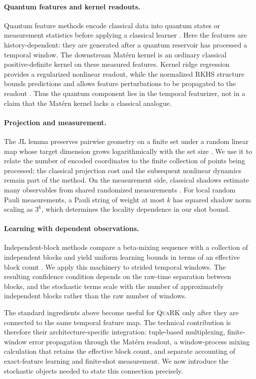 \paragraph{Quantum features and kernel readouts.}
Quantum feature methods encode classical data into quantum states or
measurement statistics before applying a classical learner
\citep{SchuldKilloran2019,HuangBroughtonEtAl2021}. Here the features are
history-dependent: they are generated after a quantum reservoir has processed
a temporal window. The downstream Mat\'ern kernel is an ordinary classical
positive-definite kernel on these measured features. Kernel ridge regression
provides a regularized nonlinear readout, while the normalized RKHS structure
bounds predictions and allows feature perturbations to be propagated to the
readout \citep{Genton2001,PorcuEtAl2024,HofmannScholkopfSmola2008}. Thus the
quantum component lies in the temporal featurizer, not in a claim that the
Mat\'ern kernel lacks a classical analogue.

\paragraph{Projection and measurement.}
The JL lemma preserves pairwise geometry on a finite set under a random linear
map whose target dimension grows logarithmically with the set size
\citep{DasguptaGupta2003,Woodruff2014}. We use it to relate the number of
encoded coordinates to the finite collection of points being processed; the
classical projection cost and the subsequent nonlinear dynamics remain part of
the method. On the measurement side, classical shadows estimate many
observables from shared randomized measurements \citep{HuangKuengPreskill2020}.
For local random Pauli measurements, a Pauli string of weight at most \(k\) has
squared shadow norm scaling as \(3^k\), which determines the locality dependence
in our shot bound.

\paragraph{Learning with dependent observations.}
Independent-block methods compare a beta-mixing sequence with a collection of
independent blocks and yield uniform learning bounds in terms of an effective
block count \citep{Yu1994,MohriRostamizadeh2008,DedeckerEtAl2007}. We apply this
machinery to strided temporal windows. The resulting confidence condition
depends on the raw-time separation between blocks, and the stochastic terms
scale with the number of approximately independent blocks rather than the raw
number of windows.

The standard ingredients above become useful for \textsc{QuaRK} only after
they are connected to the same temporal feature map. The technical
contribution is therefore their architecture-specific integration: tuple-based
multiplexing, finite-window error propagation through the Mat\'ern readout, a
window-process mixing calculation that retains the effective block count, and
separate accounting of exact-feature learning and finite-shot measurement. We
now introduce the stochastic objects needed to state this connection
precisely.
